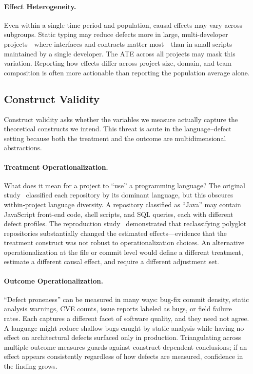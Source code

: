 \paragraph{Effect Heterogeneity.}
Even within a single time period and population, causal effects may vary across subgroups.
Static typing may reduce defects more in large, multi-developer projects---where interfaces and contracts matter most---than in small scripts maintained by a single developer.
The ATE across all projects may mask this variation.
Reporting how effects differ across project size, domain, and team composition is often more actionable than reporting the population average alone.

\subsection{Construct Validity}

Construct validity asks whether the variables we measure actually capture the theoretical constructs we intend.
This threat is acute in the language--defect setting because both the treatment and the outcome are multidimensional abstractions.

\paragraph{Treatment Operationalization.}
What does it mean for a project to ``use'' a programming language?
The original study~\cite{DBLP:conf/sigsoft/RayPFD14} classified each repository by its dominant language, but this obscures within-project language diversity.
A repository classified as ``Java'' may contain JavaScript front-end code, shell scripts, and SQL queries, each with different defect profiles.
The reproduction study~\cite{DBLP:journals/toplas/BergerHMVV19} demonstrated that reclassifying polyglot repositories substantially changed the estimated effects---evidence that the treatment construct was not robust to operationalization choices.
An alternative operationalization at the file or commit level would define a different treatment, estimate a different causal effect, and require a different adjustment set.

\paragraph{Outcome Operationalization.}
``Defect proneness'' can be measured in many ways: bug-fix commit density, static analysis warnings, CVE counts, issue reports labeled as bugs, or field failure rates.
Each captures a different facet of software quality, and they need not agree.
A language might reduce shallow bugs caught by static analysis while having no effect on architectural defects surfaced only in production.
Triangulating across multiple outcome measures guards against construct-dependent conclusions; if an effect appears consistently regardless of how defects are measured, confidence in the finding grows.

